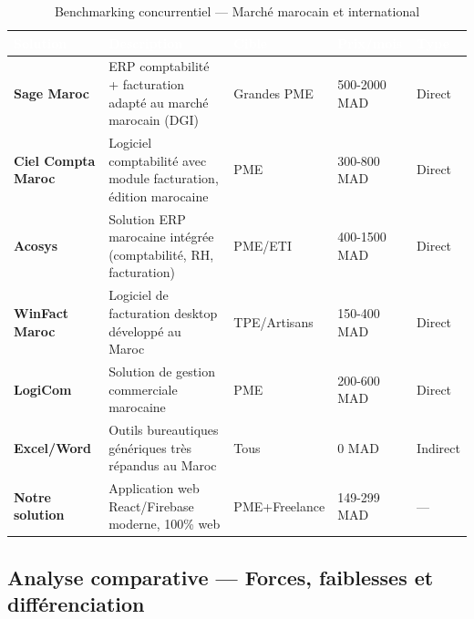 \documentclass[12pt,a4paper]{report}
\begin{document}
\begin{table}[H]
\centering
\caption{Benchmarking concurrentiel — Marché marocain et international}
\label{tab:concurrents}
\begin{tabularx}{\textwidth}{|l|X|l|l|l|}
\hline
\rowcolor{emsiblue}\textcolor{white}{\textbf{Solution}} & \textcolor{white}{\textbf{Description}} & \textcolor{white}{\textbf{Cible}} & \textcolor{white}{\textbf{Prix/mois}} & \textcolor{white}{\textbf{Type}} \\
\hline
\textbf{Sage Maroc} & ERP comptabilité + facturation adapté au marché marocain (DGI) & Grandes PME & 500-2000 MAD & Direct \\
\textbf{Ciel Compta Maroc} & Logiciel comptabilité avec module facturation, édition marocaine & PME & 300-800 MAD & Direct \\
\textbf{Acosys} & Solution ERP marocaine intégrée (comptabilité, RH, facturation) & PME/ETI & 400-1500 MAD & Direct \\
\textbf{WinFact Maroc} & Logiciel de facturation desktop développé au Maroc & TPE/Artisans & 150-400 MAD & Direct \\
\textbf{LogiCom} & Solution de gestion commerciale marocaine & PME & 200-600 MAD & Direct \\
\textbf{Excel/Word} & Outils bureautiques génériques très répandus au Maroc & Tous & 0 MAD & Indirect \\
\textbf{Notre solution} & Application web React/Firebase moderne, 100\% web & PME+Freelance & 149-299 MAD & --- \\
\hline
\end{tabularx}
\end{table}

\subsection{Analyse comparative — Forces, faiblesses et différenciation}
\end{document}
